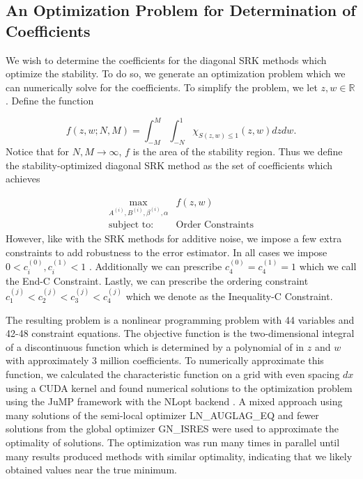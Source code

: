 \documentclass{article}
\begin{document}
\subsection{An Optimization Problem for Determination of Coefficients}

We wish to determine the coefficients for the diagonal SRK methods
which optimize the stability. To do so, we generate an optimization
problem which we can numerically solve for the coefficients. To simplify
the problem, we let $z,w\in\mathbb{R}$. Define the function

\begin{equation}
f\left(z,w;N,M\right)=\int_{-M}^{M}\int_{-N}^{1}\chi_{S(z,w)\leq1}(z,w)dzdw.\label{eq:SRIarea}
\end{equation}
Notice that for $N,M\rightarrow\infty$, $f$ is the area of the stability
region. Thus we define the stability-optimized diagonal SRK method
as the set of coefficients which achieves

\begin{align}
\max_{A^{(i)},B^{(i)},\beta^{(i)},\alpha} & f(z,w)\label{eq:opt}\\
\text{subject to: } & \text{Order Constraints}\nonumber
\end{align}
However, like with the SRK methods for additive noise, we impose
a few extra constraints to add robustness to the error estimator.
In all cases we impose $0<c_{i}^{(0)},c_{i}^{(1)}<1$ . Additionally
we can prescribe $c_{4}^{(0)}=c_{4}^{(1)}=1$ which we call the End-C
Constraint. Lastly, we can prescribe the ordering constraint $c_{1}^{(j)}<c_{2}^{(j)}<c_{3}^{(j)}<c_{4}^{(j)}$
which we denote as the Inequality-C Constraint.

The resulting problem is a nonlinear programming problem with 44 variables
and 42-48 constraint equations. The objective function is the two-dimensional
integral of a discontinuous function which is determined by a polynomial
of in $z$ and $w$ with approximately 3 million coefficients. To
numerically approximate this function, we calculated the characteristic
function on a grid with even spacing $dx$ using a CUDA kernel and
found numerical solutions to the optimization problem using the JuMP
framework \cite{RN3795} with the NLopt backend \cite{RN3788}. A
mixed approach using many solutions of the semi-local optimizer LN\_AUGLAG\_EQ
\cite{RN3797,RN3798} and fewer solutions from the global optimizer
GN\_ISRES \cite{RN3796} were used to approximate the optimality of
solutions. The optimization was run many times in parallel until many
results produced methods with similar optimality, indicating that
we likely obtained values near the true minimum.
\end{document}
